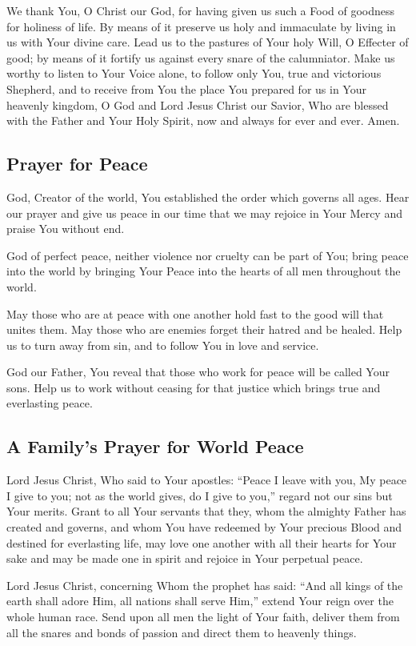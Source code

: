 \documentclass[12pt]{article}
\newcommand{\prayertitle}[1]{\subsection{#1}}
\begin{document}
We thank You, O Christ our God, for having given us such a Food of goodness for
holiness of life.
By means of it preserve us holy and immaculate by living in us with Your divine care.
Lead us to the pastures of Your holy Will, O Effecter of good; by means of it fortify us against every snare of the calumniator.
Make us worthy to listen to Your Voice alone, to follow only You, true and victorious Shepherd, and to receive from You the place You prepared for us in Your heavenly kingdom, O God and Lord Jesus Christ our Savior, Who are blessed with the Father and Your Holy Spirit, now and always for ever and ever.
Amen.

\prayertitle{Prayer for Peace}
God, Creator of the world, You established the order which governs all ages.
Hear our prayer and give us peace in our time that we may rejoice in Your Mercy and praise You without end.

God of perfect peace, neither violence nor cruelty can be part of You;
bring peace into the world by bringing Your Peace into the hearts of all men throughout the world.

May those who are at peace with one another hold fast to the good will that unites them.
May those who are enemies forget their hatred and be healed.
Help us to turn away from sin, and to follow You in love and service.

God our Father, You reveal that those who work for peace will be called Your sons.
Help us to work without ceasing for that justice which brings true and everlasting peace.

\prayertitle{A Family's Prayer for World Peace}
Lord Jesus Christ, Who said to Your apostles:
``Peace I leave with you, My peace I give to you;
not as the world gives, do I give to you,''
regard not our sins but Your merits.
Grant to all Your servants that they, whom the almighty Father has created and governs, and whom You have redeemed by Your precious Blood and destined for everlasting life, may love one another with all their hearts for Your sake and may be made one in spirit and rejoice in Your perpetual peace.

Lord Jesus Christ, concerning Whom the prophet has said:
``And all kings of the earth shall adore Him, all nations shall serve Him,''
extend Your reign over the whole human race.
Send upon all men the light of Your faith, deliver them from all the snares and bonds of passion and direct them to heavenly things.
\end{document}
